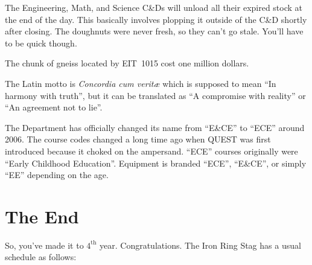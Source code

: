 \documentclass{book}
\begin{document}
The Engineering, Math, and Science C\&Ds will unload all their expired stock at the end of the day. This basically involves plopping it outside of the C\&D shortly after closing. The doughnuts were never fresh, so they can't go stale. You'll have to be quick though.

The chunk of gneiss located by EIT~1015 cost one million dollars.

The Latin motto is \textsl{Concordia cum verit\ae} which is supposed to mean ``In harmony with truth'', but it can be translated as ``A compromise with reality'' or ``An agreement not to lie''.

The Department has officially changed its name from ``E\&CE'' to ``ECE'' around 2006. The course codes changed a long time ago when QUEST was first introduced because it choked on the ampersand. ``ECE'' courses originally were ``Early Childhood Education''. Equipment is branded ``ECE'', ``E\&CE'', or simply ``EE'' depending on the age.

\chapter{The End}
So, you've made it to $4^{\mathrm{th}}$ year. Congratulations. The Iron Ring Stag has a usual schedule as follows:
\end{document}

